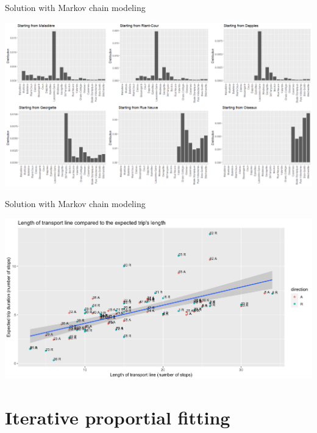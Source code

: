 \documentclass[10pt]{beamer}
\begin{document}
	
	\begin{frame}{Solution with Markov chain modeling}

		\begin{center}
			\includegraphics[width=\textwidth]{img/stop_distributions.png} 
		\end{center}
	
	\end{frame}
	
	
	\begin{frame}{Solution with Markov chain modeling}
		
		\begin{center}
			\includegraphics[width=\textwidth]{img/length_exp.png} 
		\end{center}
		
	\end{frame}
	
	
	\section{Iterative proportial fitting}
	
\end{document}
